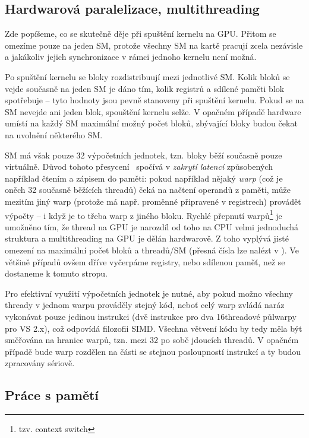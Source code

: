     \subsection{Hardwarová paralelizace, multithreading}

    Zde popíšeme, co se skutečně děje při spuštění kernelu na GPU. Přitom se omezíme pouze na jeden SM, protože všechny SM na kartě pracují zcela nezávisle a jakákoliv jejich synchronizace v rámci jednoho kernelu není možná.

    Po spuštění kernelu se bloky rozdistribuují mezi jednotlivé SM. Kolik bloků se vejde současně na jeden SM je dáno tím, kolik registrů a sdílené paměti blok spotřebuje -- tyto hodnoty jsou pevně stanoveny při spuštění kernelu. Pokud se na SM nevejde ani jeden blok, spouštění kernelu selže. V opačném případě hardware umístí na každý SM maximální možný počet bloků, zbývající bloky budou čekat na uvolnění některého SM.

    SM má však pouze 32 výpočetních jednotek, tzn. bloky běží současně pouze virtuálně. Důvod tohoto \bq přesycení\eq~ spočívá v \emph{zakrytí latencí} způsobených například čtením a zápisem do paměti: pokud například nějaký \emph{warp} (což je oněch 32 současně běžících threadů) čeká na načtení operandů z paměti, může mezitím jiný warp (protože má např. proměnné připravené v registrech) provádět výpočty -- i když je to třeba warp z jiného bloku. Rychlé přepnutí warpů\footnote{tzv. context switch} je umožněno tím, že thread na GPU je narozdíl od toho na CPU velmi jednoduchá struktura a multithreading na GPU je dělán hardwarově. Z toho vyplývá jisté omezení na maximální počet bloků a threadů/SM (přesná čísla lze nalézt v \cite{CUDA programming g.}). Ve většině případů ovšem dříve vyčerpáme registry, nebo sdílenou paměť, než se dostaneme k tomuto stropu.

    Pro efektivní využití výpočetních jednotek je nutné, aby pokud možno všechny thready v jednom warpu prováděly stejný kód, neboť celý warp zvládá naráz vykonávat pouze jedinou instrukci (dvě instrukce pro dva 16threadové půlwarpy pro VS 2.x), což odpovídá filozofii SIMD. Všechna větvení kódu by tedy měla být směřována na hranice warpů, tzn. mezi 32 po sobě jdoucích threadů. V opačném případě bude warp rozdělen na části se stejnou posloupností instrukcí a ty budou zpracovány sériově.

    \subsection{Práce s pamětí}

